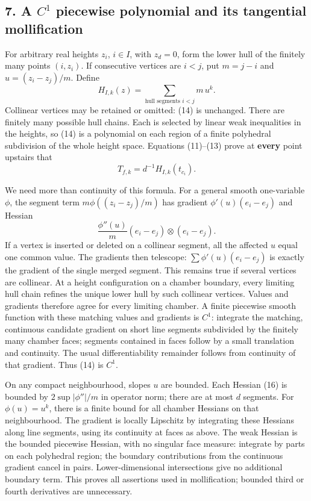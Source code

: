 \documentclass[11pt]{article}
\begin{document}
\subsection{\texorpdfstring{7. A \(C^1\) piecewise polynomial and its
tangential
mollification}{7. A C\^{}1 piecewise polynomial and its tangential mollification}}\label{a-c1-piecewise-polynomial-and-its-tangential-mollification}

For arbitrary real heights \(z_i\), \(i\in I\), with \(z_d=0\), form the
lower hull of the finitely many points \((i,z_i)\). If consecutive
vertices are \(i<j\), put \(m=j-i\) and \(u=(z_i-z_j)/m\). Define \[
               H_{I,k}(z)=\sum_{\text{hull segments }i<j}
                                 m\,u^k.                \tag{14}
\] Collinear vertices may be retained or omitted: (14) is unchanged.
There are finitely many possible hull chains. Each is selected by linear
weak inequalities in the heights, so (14) is a polynomial on each region
of a finite polyhedral subdivision of the whole height space. Equations
(11)--(13) prove at \textbf{every} point upstairs that \[
               T_{f,k}=d^{-1}H_{I,k}(t_{c_i}).            \tag{15}
\]

We need more than continuity of this formula. For a general smooth
one-variable \(\phi\), the segment term \(m\phi((z_i-z_j)/m)\) has
gradient \(\phi'(u)(e_i-e_j)\) and Hessian \[
            \frac{\phi''(u)}m(e_i-e_j)\otimes(e_i-e_j).  \tag{16}
\] If a vertex is inserted or deleted on a collinear segment, all the
affected \(u\) equal one common value. The gradients then telescope:
\(\sum\phi'(u)(e_i-e_j)\) is exactly the gradient of the single merged
segment. This remains true if several vertices are collinear. At a
height configuration on a chamber boundary, every limiting hull chain
refines the unique lower hull by such collinear vertices. Values and
gradients therefore agree for every limiting chamber. A finite piecewise
smooth function with these matching values and gradients is \(C^1\):
integrate the matching, continuous candidate gradient on short line
segments subdivided by the finitely many chamber faces; segments
contained in faces follow by a small translation and continuity. The
usual differentiability remainder follows from continuity of that
gradient. Thus (14) is \(C^1\).

On any compact neighbourhood, slopes \(u\) are bounded. Each Hessian
(16) is bounded by \(2\sup|\phi''|/m\) in operator norm; there are at
most \(d\) segments. For \(\phi(u)=u^k\), there is a finite bound for
all chamber Hessians on that neighbourhood. The gradient is locally
Lipschitz by integrating these Hessians along line segments, using its
continuity at faces as above. The weak Hessian is the bounded piecewise
Hessian, with no singular face measure: integrate by parts on each
polyhedral region; the boundary contributions from the continuous
gradient cancel in pairs. Lower-dimensional intersections give no
additional boundary term. This proves all assertions used in
mollification; bounded third or fourth derivatives are unnecessary.
\end{document}
